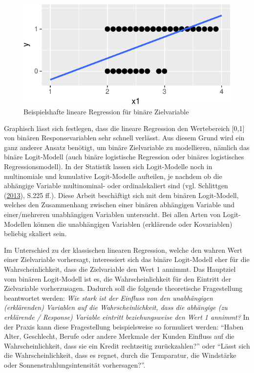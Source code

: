 \documentclass[12pt,]{article}
\begin{document}
\begin{figure}[h]

{\centering \includegraphics{logisticRegression_files/figure-latex/unnamed-chunk-1-1} 

}

\caption{Beispielshafte lineare Regression für binäre Zielvariable}\label{fig:unnamed-chunk-1}
\end{figure}

Graphisch lässt sich festlegen, dass die lineare Regression den
Wertebereich {[}0,1{]} von binären Responsevariablen sehr schnell
verlässt. Aus diesem Grund wird ein ganz anderer Ansatz benötigt, um
binäre Zielvariable zu modellieren, nämlich das binäre Logit-Modell
(auch binäre logistische Regression oder binäres logistisches
Regressionsmodell). In der Statistik lassen sich Logit-Modelle noch in
multinomiale und kumulative Logit-Modelle aufteilen, je nachdem ob die
abhängige Variable multinominal- oder ordinalskaliert sind (vgl.
Schlittgen
(\protect\hyperlink{ref-schlittgen2013regressionsanalysen}{2013}), S.225
ff.). Diese Arbeit beschäftigt sich mit dem binären Logit-Modell,
welches den Zusammenhang zwischen einer binären abhängigen Variable und
einer/mehreren unabhängigen Variablen untersucht. Bei allen Arten von
Logit-Modellen können die unabhängigen Variablen (erklärende oder
Kovariablen) beliebig skaliert sein.

Im Unterschied zu der klassischen linearen Regression, welche den wahren
Wert einer Zielvariable vorhersagt, interessiert sich das binäre
Logit-Modell eher für die Wahrscheinlichkeit, dass die Zielvariable den
Wert 1 annimmt. Das Hauptziel vom binären Logit-Modell ist es, die
Wahrscheinlichkeit für den Eintritt der Zielvariable vorherzusagen.
Dadurch soll die folgende theoretische Fragestellung beantwortet werden:
\emph{Wie stark ist der Einfluss von den unabhängigen (erklärenden)
Variablen auf die Wahrscheinlichkeit, dass die abhängige (zu erklärende
/ Response) Variable eintritt beziehungsweise den Wert 1 annimmt?} In
der Praxis kann diese Fragestellung beispielsweise so formuliert werden:
``Haben Alter, Geschlecht, Berufe oder andere Merkmale der Kunden
Einfluss auf die Wahrscheinlichkeit, dass sie ein Kredit rechtzeitig
zurückzahlen?'' oder ``Lässt sich die Wahrscheinlichkeit, dass es
regnet, durch die Temparatur, die Windstärke oder
Sonnenstrahlungsintensität vorhersagen?''. \newpage 
\end{document}
